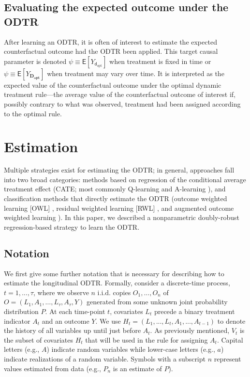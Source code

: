 \documentclass[11pt]{article}
\renewcommand{\d}{\mathsf{d}}
\newcommand{\E}{\mathsf{E}}
\theoremstyle{example}
\begin{document}
\subsection*{Evaluating the expected outcome under the ODTR}\label{section:psi} 
 
After learning an ODTR, it is often of interest to estimate the expected counterfactual outcome had the ODTR been applied. This target causal parameter is denoted $\psi \equiv \E[Y_{\d_{\text{opt}}}]$ when treatment is fixed in time or $\psi \equiv\E[Y_{\mathbf{D_\text{opt}}}]$ when treatment may vary over time. It is interpreted as the expected value of the counterfactual outcome under the optimal dynamic treatment rule---the average value of the counterfactual outcome of interest if, possibly contrary to what was observed, treatment had been assigned according to the optimal rule.

\section*{Estimation}\label{estimation}

Multiple strategies exist for estimating the ODTR; in general, approaches fall into two broad categories: methods based on regression of the conditional average treatment effect (CATE; most commonly Q-learning \citep{watkins1989learning,moodieQlearning2012} and A-learning \citep{murphyODTR2003}), and classification methods that directly estimate the ODTR (outcome weighted learning [OWL] \citep{owl2012}, residual weighted learning [RWL] \citep{ZhouRWL}, and augmented outcome weighted learning \citep{YingAOWL2018}). In this paper, we described a nonparametric doubly-robust regression-based strategy to learn the ODTR. 

\subsection*{Notation}
We first give some further notation that is necessary for describing how to estimate the longitudinal ODTR. Formally, consider a discrete-time process, $t = 1, ..., \tau$, where we observe $n$ i.i.d. copies $O_1, ..., O_n$ of $O = (L_1, A_1,\ldots,L_\tau,A_\tau, Y)$ generated from some unknown joint probability distribution $P$. At each time-point $t$, covariates $L_t$ precede a binary treatment indicator $A_t$ and an outcome $Y$. We use $H_t = (L_1, ..., L_t, A_1, ..., A_{t-1})$ to denote the history of all variables up until just before $A_t$. As previously mentioned, $V_t$ is the subset of covariates $H_t$ that will be used in the rule for assigning $A_t$. Capital letters (e.g., $A$) indicate random variables while lower-case letters (e.g., $a$) indicate realizations of a random variable. Symbols with a subscript $n$ represent values estimated from data (e.g., $P_n$ is an estimate of $P$). 
\end{document}
